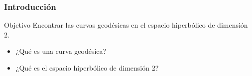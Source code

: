 \begin{frame}
\frametitle{Introducción}
  \begin{block}{Objetivo}
    Encontrar las curvas geodésicas en el espacio hiperbólico de dimensión 2.
  \end{block} \pause

  \begin{itemize}
    \item ¿Qué es una curva geodésica? \pause
    \item ¿Qué es el espacio hiperbólico de dimensión 2? 
  \end{itemize}
\end{frame}

